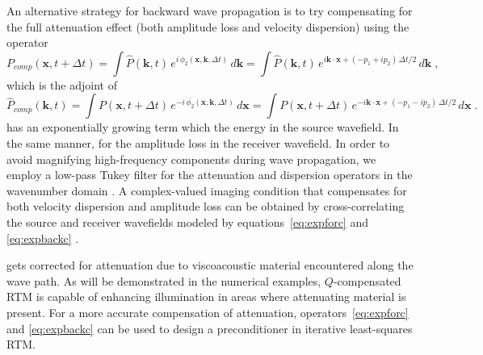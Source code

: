 An alternative strategy for backward wave propagation is to try compensating for the full attenuation effect (both amplitude loss and velocity dispersion) using the operator
\begin{equation}
  \label{eq:expforc}
  P_{comp}(\mathbf{x},t+\Delta t) = \int \hat{P}(\mathbf{k},t)\,e^{i\,\phi_2(\mathbf{x},\mathbf{k},\Delta t)}\,d\mathbf{k}
  = \int \hat{P}(\mathbf{k},t)\,e^{i\mathbf{k} \cdot \mathbf{x} + (-p_1 + ip_2)\,\Delta t/2}\,d\mathbf{k} \; ,
\end{equation}
which is the adjoint of
\begin{equation}
  \label{eq:expbackc}
  \hat{P}_{comp}(\mathbf{k},t) = \int P(\mathbf{x},t+\Delta t)\,e^{-i\,\bar{\phi_2}(\mathbf{x},\mathbf{k},\Delta t)}\,d\mathbf{x}
  = \int P(\mathbf{x},t+\Delta t)\,e^{-i\mathbf{k} \cdot \mathbf{x} + (-p_1 - ip_2)\,\Delta t/2}\,d\mathbf{x} \; .
\end{equation}
 has an exponentially growing term which  the energy in the source wavefield. In the same manner,  for the amplitude loss in the receiver wavefield. In order to avoid magnifying high-frequency components during wave propagation, we employ a low-pass Tukey filter for the attenuation and dispersion operators in the wavenumber domain \cite[]{zhu14b}. A complex-valued imaging condition that compensates for both velocity dispersion and amplitude loss can be obtained by cross-correlating the source and receiver wavefields modeled by equations~\ref{eq:expforc} and \ref{eq:expbackc} \cite[]{zhu14b}.

 gets corrected for attenuation due to viscoacoustic material encountered along the wave path. As will be demonstrated in the numerical examples, $Q$-compensated RTM is capable of enhancing illumination in areas where attenuating material is present. For a more accurate compensation of attenuation, operators~\ref{eq:expforc} and \ref{eq:expbackc} can be used to design a preconditioner in iterative least-squares RTM.

